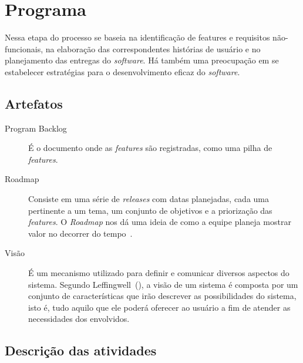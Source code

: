 \section{Programa}
Nessa etapa do processo se baseia na identificação de features e requisitos não-funcionais, na elaboração das correspondentes histórias de usuário e no planejamento das entregas do \textit{software}. Há também uma preocupação em se estabelecer estratégias para o desenvolvimento eficaz do \textit{software}.

\subsection{Artefatos}
\begin{description}
\item[Program Backlog] É o documento onde as \textit{features} são registradas, como uma pilha de \textit{features}.
\item[Roadmap] Consiste em uma série de \textit{releases} com datas planejadas, cada uma pertinente a um tema, um conjunto de objetivos e a priorização das \textit{features}. O \textit{Roadmap} nos dá uma ideia de como a equipe planeja mostrar valor no decorrer do tempo~\cite{leffingwell}.
\item[Visão] É um mecanismo utilizado para definir e comunicar diversos aspectos do sistema. Segundo Leffingwell~(\citeyear{leffingwell}), a visão de um sistema é composta por um conjunto de características que irão descrever as possibilidades do sistema, isto é, tudo aquilo que ele poderá oferecer ao usuário a fim de atender as necessidades dos envolvidos.
\end{description}

\clearpage

\subsection{Descrição das atividades}

